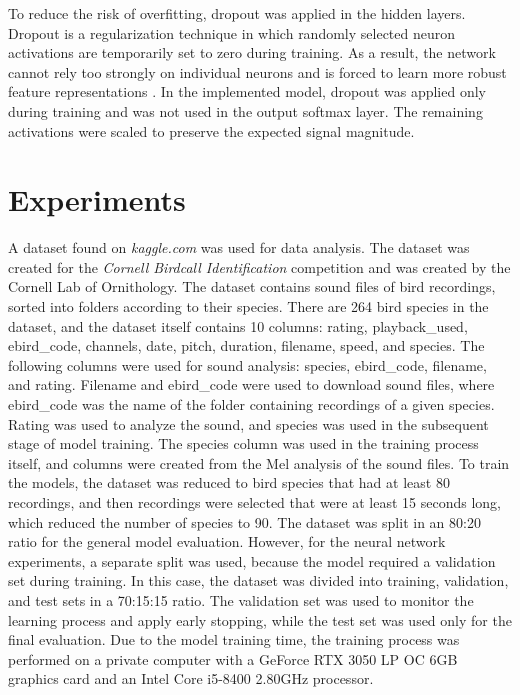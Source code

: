 \documentclass[
onecolumn,
]{ceurart}
\begin{document}
	To reduce the risk of overfitting, dropout was applied in the hidden layers. Dropout is a regularization technique in which randomly selected neuron activations are temporarily set to zero during training. As a result, the network cannot rely too strongly on individual neurons and is forced to learn more robust feature representations \cite{srivastava2014dropout}. In the implemented model, dropout was applied only during training and was not used in the output softmax layer. The remaining activations were scaled to preserve the expected signal magnitude.
	
	\section{Experiments}
	A dataset found on \textit{kaggle.com}\cite{kaggle} was used for data analysis. The dataset was created for the \textit{Cornell Birdcall Identification} competition and was created by the Cornell Lab of Ornithology\cite{kaggle}. The dataset contains sound files of bird recordings, sorted into folders according to their species. There are 264 bird species in the dataset, and the dataset itself contains 10 columns: rating, playback\_used, ebird\_code, channels, date, pitch, duration, filename, speed, and species. The following columns were used for sound analysis: species, ebird\_code, filename, and rating. Filename and ebird\_code were used to download sound files, where ebird\_code was the name of the folder containing recordings of a given species. Rating was used to analyze the sound, and species was used in the subsequent stage of model training. The species column was used in the training process itself, and columns were created from the Mel analysis of the sound files. To train the models, the dataset was reduced to bird species that had at least 80 recordings, and then recordings were selected that were at least 15 seconds long, which reduced the number of species to 90. The dataset was split in an 80:20 ratio for the general model evaluation. However, for the neural network experiments, a separate split was used, because the model required a validation set during training. In this case, the dataset was divided into training, validation, and test sets in a 70:15:15 ratio. The validation set was used to monitor the learning process and apply early stopping, while the test set was used only for the final evaluation. Due to the model training time, the training process was performed on a private computer with a GeForce RTX 3050 LP OC 6GB graphics card and an Intel Core i5-8400 2.80GHz processor.
	
\end{document}
